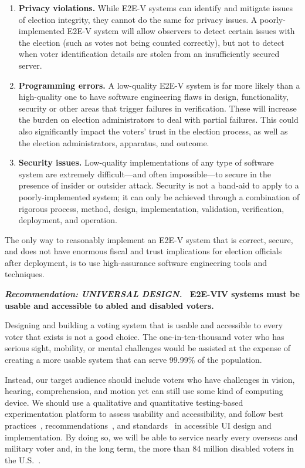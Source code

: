 \begin{enumerate}
\item \textbf{Privacy violations.} While E2E-V systems can identify
  and mitigate issues of election integrity, they cannot do the same
  for privacy issues. A poorly-implemented E2E-V system will allow
  observers to detect certain issues with the election (such as votes
  not being counted correctly), but not to detect when voter
  identification details are stolen from an insufficiently secured
  server.
\item \textbf{Programming errors.} A low-quality E2E-V system is far
  more likely than a high-quality one to have software engineering
  flaws in design, functionality, security or other areas that trigger
  failures in verification. These will increase the burden on election
  administrators to deal with partial failures. This could also
  significantly impact the voters' trust in the election process, as
  well as the election administrators, apparatus, and outcome.
\item \textbf{Security issues.} Low-quality implementations of any
  type of software system are extremely difficult---and often
  impossible---to secure in the presence of insider or outsider
  attack. Security is not a band-aid to apply to a poorly-implemented
  system; it can only be achieved through a combination of rigorous
  process, method, design, implementation, validation, verification,
  deployment, and operation.
\end{enumerate}

The only way to reasonably implement an E2E-V system that is correct,
secure, and does not have enormous fiscal and trust implications for
election officials after deployment, is to use high-assurance software
engineering tools and techniques.

\vspace{12pt} \textbf{\emph{Recommendation: UNIVERSAL DESIGN.} \
  E2E-VIV systems must be usable and accessible to abled and disabled
  voters.}

Designing and building a voting system that is usable and accessible
to every voter that exists is not a good choice. The
one-in-ten-thousand voter who has serious sight, mobility, or
mental challenges would be assisted at the expense of creating a more
usable system that can serve 99.99\% of the population.

Instead, our target audience should include voters who have challenges
in vision, hearing, comprehension, and motion yet can still use some
kind of computing device. We should use a qualitative and quantitative
testing-based experimentation platform to assess usability and
accessibility, and follow best
practices~\cite{materials-at-elections.itif.org},
recommendations~\cite{WAI,Section508,WAVE}, and
standards~\cite{ADAStandards} in accessible UI design and
implementation. By doing so, we will be able to service nearly every
overseas and military voter and, in the long term, the more than 84
million disabled voters in the U.S.~\cite{CensusData}.

